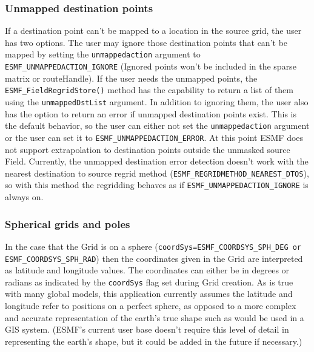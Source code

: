 \subsubsection{Unmapped destination points}
 If a destination point can't be mapped to a location in the source grid, the user has two options. The user may ignore those destination points
 that can't be mapped by setting the {\tt unmappedaction} argument to {\tt ESMF\_UNMAPPEDACTION\_IGNORE} (Ignored points won't be included in
 the sparse matrix or routeHandle). If the user needs the unmapped points, the {\tt ESMF\_FieldRegridStore()} method has the capability to return
 a list of them using the {\tt unmappedDstList} argument.  In addition to ignoring them, the user also has the option to return
 an error if unmapped destination points exist. This is the default behavior, so the user can either not set the {\tt unmappedaction} argument
 or the user can set it to {\tt ESMF\_UNMAPPEDACTION\_ERROR}. At this point ESMF does not support extrapolation to destination points outside 
 the unmasked source Field. Currently, the unmapped destination error detection doesn't work with the nearest destination to source regrid method
({\tt ESMF\_REGRIDMETHOD\_NEAREST\_DTOS}), so with this method the regridding behaves as if {\tt ESMF\_UNMAPPEDACTION\_IGNORE} is always on. 

\subsubsection{Spherical grids and poles}
In the case that the Grid is on a sphere ({\tt coordSys=ESMF\_COORDSYS\_SPH\_DEG or ESMF\_COORDSYS\_SPH\_RAD})
then the coordinates given in the Grid are interpreted as latitude and longitude values. The coordinates can either be in degrees or radians as indicated by the 
{\tt coordSys} flag set during Grid creation. As is true with many global models, this application currently assumes the latitude and longitude refer to positions on a 
perfect sphere, as opposed to a more complex and accurate representation of the earth's true shape such as would be used in a GIS system. (ESMF's current user base doesn't 
require this level of detail in representing the earth's shape, but it could be added in the future if necessary.)

